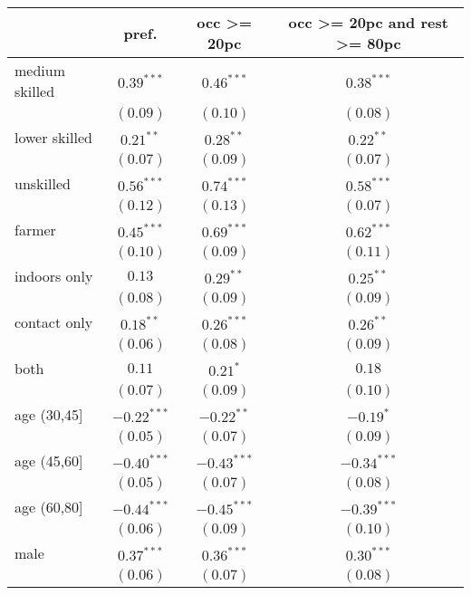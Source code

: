 
\begin{table}[h!]
\begin{center}
\begin{small}
\begin{tabular}{l c c c}
\hline
 & pref. & occ >= 20pc & occ >= 20pc and rest >= 80pc \\
\hline
medium skilled & $0.39^{***}$  & $0.46^{***}$  & $0.38^{***}$  \\
               & $(0.09)$      & $(0.10)$      & $(0.08)$      \\
lower skilled  & $0.21^{**}$   & $0.28^{**}$   & $0.22^{**}$   \\
               & $(0.07)$      & $(0.09)$      & $(0.07)$      \\
unskilled      & $0.56^{***}$  & $0.74^{***}$  & $0.58^{***}$  \\
               & $(0.12)$      & $(0.13)$      & $(0.07)$      \\
farmer         & $0.45^{***}$  & $0.69^{***}$  & $0.62^{***}$  \\
               & $(0.10)$      & $(0.09)$      & $(0.11)$      \\
indoors only   & $0.13$        & $0.29^{**}$   & $0.25^{**}$   \\
               & $(0.08)$      & $(0.09)$      & $(0.09)$      \\
contact only   & $0.18^{**}$   & $0.26^{***}$  & $0.26^{**}$   \\
               & $(0.06)$      & $(0.08)$      & $(0.09)$      \\
both           & $0.11$        & $0.21^{*}$    & $0.18$        \\
               & $(0.07)$      & $(0.09)$      & $(0.10)$      \\
age (30,45]    & $-0.22^{***}$ & $-0.22^{**}$  & $-0.19^{*}$   \\
               & $(0.05)$      & $(0.07)$      & $(0.09)$      \\
age (45,60]    & $-0.40^{***}$ & $-0.43^{***}$ & $-0.34^{***}$ \\
               & $(0.05)$      & $(0.07)$      & $(0.08)$      \\
age (60,80]    & $-0.44^{***}$ & $-0.45^{***}$ & $-0.39^{***}$ \\
               & $(0.06)$      & $(0.09)$      & $(0.10)$      \\
male           & $0.37^{***}$  & $0.36^{***}$  & $0.30^{***}$  \\
               & $(0.06)$      & $(0.07)$      & $(0.08)$      \\

\end{tabular}
\end{small}
\end{center}
\end{table}
